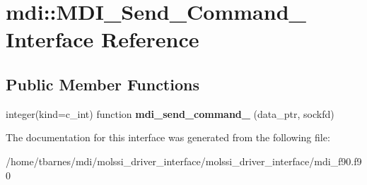 \hypertarget{interfacemdi_1_1MDI__Send__Command__}{\section{mdi\-:\-:M\-D\-I\-\_\-\-Send\-\_\-\-Command\-\_\- Interface Reference}
\label{interfacemdi_1_1MDI__Send__Command__}
}
\subsection*{Public Member Functions}
\begin{DoxyCompactItemize}
\item 
\hypertarget{interfacemdi_1_1MDI__Send__Command___ad38ef0c37877df2a9ef3ff3536ec89c5}{integer(kind=c\-\_\-int) function {\bfseries mdi\-\_\-send\-\_\-command\-\_\-} (data\-\_\-ptr, sockfd)}\label{interfacemdi_1_1MDI__Send__Command___ad38ef0c37877df2a9ef3ff3536ec89c5}

\end{DoxyCompactItemize}


The documentation for this interface was generated from the following file\-:\begin{DoxyCompactItemize}
\item 
/home/tbarnes/mdi/molssi\-\_\-driver\-\_\-interface/molssi\-\_\-driver\-\_\-interface/mdi\-\_\-f90.\-f90\end{DoxyCompactItemize}
